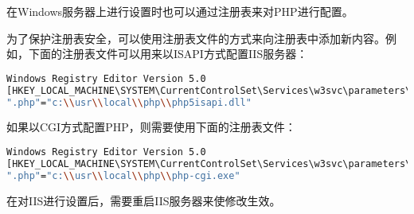 在Windows服务器上进行设置时也可以通过注册表来对PHP进行配置。

为了保护注册表安全，可以使用注册表文件的方式来向注册表中添加新内容。例如，下面的注册表文件可以用来以ISAPI方式配置IIS服务器：


\begin{lstlisting}[language=bash]
Windows Registry Editor Version 5.0
[HKEY_LOCAL_MACHINE\SYSTEM\CurrentControlSet\Services\w3svc\parameters\Script Map]
".php"="c:\\usr\\local\\php\\php5isapi.dll"
\end{lstlisting}

如果以CGI方式配置PHP，则需要使用下面的注册表文件：




\begin{lstlisting}[language=bash]
Windows Registry Editor Version 5.0
[HKEY_LOCAL_MACHINE\SYSTEM\CurrentControlSet\Services\w3svc\parameters\Script Map]
".php"="c:\\usr\\local\\php\\php-cgi.exe"
\end{lstlisting}

在对IIS进行设置后，需要重启IIS服务器来使修改生效。




\begin{lstlisting}[language=bash]

\end{lstlisting}




\begin{lstlisting}[language=bash]

\end{lstlisting}





\begin{lstlisting}[language=bash]

\end{lstlisting}





\begin{lstlisting}[language=bash]

\end{lstlisting}





